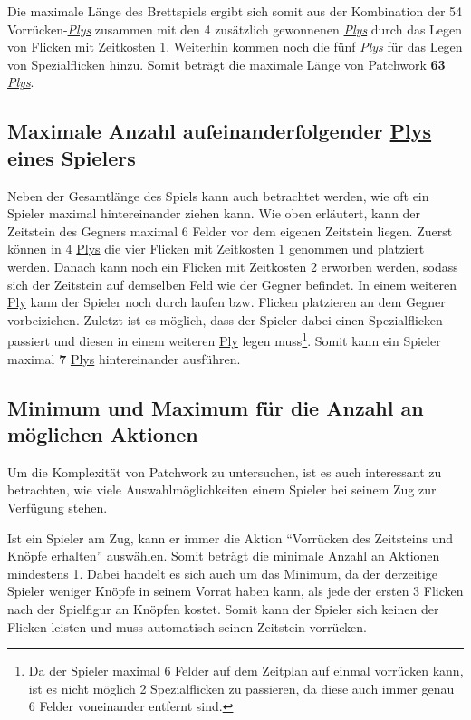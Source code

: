 Die maximale Länge des Brettspiels ergibt sich somit aus der Kombination der 54 Vorrücken-\hyperref[text:ply]{\emph{Plys}} zusammen mit den 4 zusätzlich gewonnenen \hyperref[text:ply]{\emph{Plys}} durch das Legen von Flicken mit Zeitkosten 1. Weiterhin kommen noch die fünf \hyperref[text:ply]{\emph{Plys}} für das Legen von Spezialflicken hinzu. Somit beträgt die maximale Länge von Patchwork \textbf{63} \hyperref[text:ply]{\emph{Plys}}.

\subsection*{Maximale Anzahl aufeinanderfolgender \hyperref[text:ply]{Plys} eines Spielers}

Neben der Gesamtlänge des Spiels kann auch betrachtet werden, wie oft ein Spieler maximal hintereinander ziehen kann. Wie oben erläutert, kann der Zeitstein des Gegners maximal 6 Felder vor dem eigenen Zeitstein liegen. Zuerst können in 4 \hyperref[text:ply]{Plys} die vier Flicken mit Zeitkosten 1 genommen und platziert werden. Danach kann noch ein Flicken mit Zeitkosten 2 erworben werden, sodass sich der Zeitstein auf demselben Feld wie der Gegner befindet. In einem weiteren \hyperref[text:ply]{Ply} kann der Spieler noch durch laufen bzw. Flicken platzieren an dem Gegner vorbeiziehen. Zuletzt ist es möglich, dass der Spieler dabei einen Spezialflicken passiert und diesen in einem weiteren \hyperref[text:ply]{Ply} legen muss\footnote{Da der Spieler maximal 6 Felder auf dem Zeitplan auf einmal vorrücken kann, ist es nicht möglich 2 Spezialflicken zu passieren, da diese auch immer genau 6 Felder voneinander entfernt sind.}. Somit kann ein Spieler maximal \textbf{7} \hyperref[text:ply]{Plys} hintereinander ausführen.

\subsection*{Minimum und Maximum für die Anzahl an möglichen Aktionen}

Um die Komplexität von Patchwork zu untersuchen, ist es auch interessant zu betrachten, wie viele Auswahlmöglichkeiten einem Spieler bei seinem Zug zur Verfügung stehen.

Ist ein Spieler am Zug, kann er immer die Aktion \enquote{Vorrücken des Zeitsteins und Knöpfe erhalten} auswählen. Somit beträgt die minimale Anzahl an Aktionen mindestens 1. Dabei handelt es sich auch um das Minimum, da der derzeitige Spieler weniger Knöpfe in seinem Vorrat haben kann, als jede der ersten 3 Flicken nach der Spielfigur an Knöpfen kostet. Somit kann der Spieler sich keinen der Flicken leisten und muss automatisch seinen Zeitstein vorrücken.


